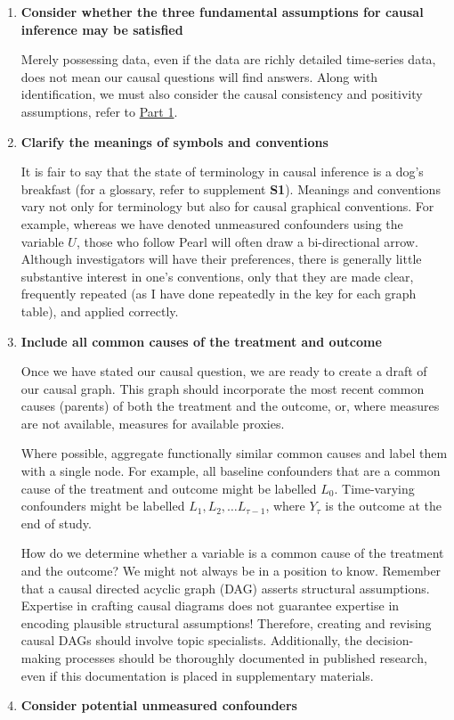 \documentclass[
  single column]{article}
\begin{document}
\begin{enumerate}
\def\labelenumi{\arabic{enumi}.}
\setcounter{enumi}{1}
\item
  \textbf{Consider whether the three fundamental assumptions for causal
  inference may be satisfied}

  Merely possessing data, even if the data are richly detailed
  time-series data, does not mean our causal questions will find
  answers. Along with identification, we must also consider the causal
  consistency and positivity assumptions, refer to
  \hyperref[id-sec-1]{Part 1}.
\item
  \textbf{Clarify the meanings of symbols and conventions}

  It is fair to say that the state of terminology in causal inference is
  a dog's breakfast (for a glossary, refer to supplement \textbf{S1}).
  Meanings and conventions vary not only for terminology but also for
  causal graphical conventions. For example, whereas we have denoted
  unmeasured confounders using the variable \(U\), those who follow
  Pearl will often draw a bi-directional arrow. Although investigators
  will have their preferences, there is generally little substantive
  interest in one's conventions, only that they are made clear,
  frequently repeated (as I have done repeatedly in the key for each
  graph table), and applied correctly.
\item
  \textbf{Include all common causes of the treatment and outcome}

  Once we have stated our causal question, we are ready to create a
  draft of our causal graph. This graph should incorporate the most
  recent common causes (parents) of both the treatment and the outcome,
  or, where measures are not available, measures for available proxies.

  Where possible, aggregate functionally similar common causes and label
  them with a single node. For example, all baseline confounders that
  are a common cause of the treatment and outcome might be labelled
  \(L_0\). Time-varying confounders might be labelled
  \(L_1, L_2, \dots L_{\tau -1}\), where \(Y_\tau\) is the outcome at
  the end of study.

  How do we determine whether a variable is a common cause of the
  treatment and the outcome? We might not always be in a position to
  know. Remember that a causal directed acyclic graph (DAG) asserts
  structural assumptions. Expertise in crafting causal diagrams does not
  guarantee expertise in encoding plausible structural assumptions!
  Therefore, creating and revising causal DAGs should involve topic
  specialists. Additionally, the decision-making processes should be
  thoroughly documented in published research, even if this
  documentation is placed in supplementary materials.
\item
  \textbf{Consider potential unmeasured confounders}


\end{enumerate}
\end{document}
